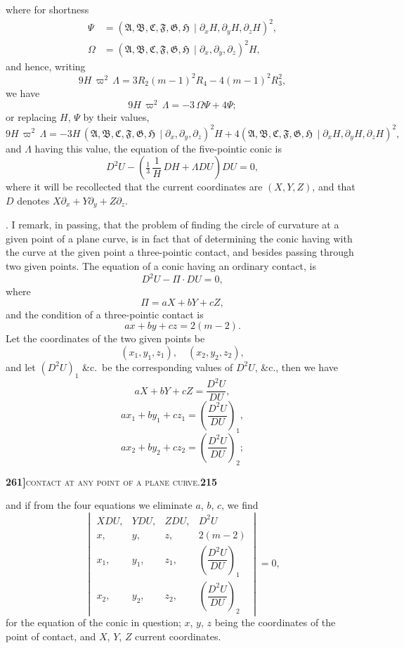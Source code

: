 \documentclass[11pt]{article}
\newcommand{\Cdel}{\mid}
\begin{document}
\noindent where for shortness
\[
\begin{aligned}
\Psi &= (\mathfrak{A}, \mathfrak{B}, \mathfrak{C}, \mathfrak{F}, \mathfrak{G}, \mathfrak{H}\,\Cdel\partial_x H, \partial_y H, \partial_z H)^2,\\
\Omega &= (\mathfrak{A}, \mathfrak{B}, \mathfrak{C}, \mathfrak{F}, \mathfrak{G}, \mathfrak{H}\,\Cdel\partial_x, \partial_y, \partial_z)^2 H,
\end{aligned}
\]
and hence, writing
\[
9H\,\varpi^2\,\Lambda = 3R_2(m-1)^2 R_4 - 4(m-1)^2 R_3^2,
\]
we have
\[
9H\,\varpi^2\,\Lambda = -3\,\Omega\Psi + 4\Psi;
\]
or replacing $H$, $\Psi$ by their values,
\[
9H\,\varpi^2\,\Lambda
   = -3H\,(\mathfrak{A}, \mathfrak{B}, \mathfrak{C}, \mathfrak{F}, \mathfrak{G}, \mathfrak{H}\,\Cdel\partial_x, \partial_y, \partial_z)^2 H
   + 4(\mathfrak{A}, \mathfrak{B}, \mathfrak{C}, \mathfrak{F}, \mathfrak{G}, \mathfrak{H}\,\Cdel\partial_x H, \partial_y H, \partial_z H)^2,
\]
and $\Lambda$ having this value, the equation of the five-pointic conic is
\[
D^2 U - \!\left(\tfrac{1}{3}\,\frac{1}{H}\,DH + \Lambda DU\right)\!DU = 0,
\]
where it will be recollected that the current coordinates are $(X, Y, Z)$, and that $D$ denotes $X\partial_x + Y\partial_y + Z\partial_z$.

\medskip

. I remark, in passing, that the problem of finding the circle of curvature at a given point of a plane curve, is in fact that of determining the conic having with the curve at the given point a three-pointic contact, and besides passing through two given points. The equation of a conic having an ordinary contact, is
\[
D^2 U - \Pi \cdot DU = 0,
\]
where
\[
\Pi = aX + bY + cZ,
\]
and the condition of a three-pointic contact is
\[
ax + by + cz = 2(m - 2).
\]
Let the coordinates of the two given points be
\[
(x_1, y_1, z_1),\quad (x_2, y_2, z_2),
\]
and let $(D^2U)_1$ \&c.\ be the corresponding values of $D^2U$, \&c., then we have
\[
aX + bY + cZ = \frac{D^2U}{DU},
\]
\[
ax_1 + by_1 + cz_1 = \!\left(\frac{D^2U}{DU}\right)_{\!1},
\]
\[
ax_2 + by_2 + cz_2 = \!\left(\frac{D^2U}{DU}\right)_{\!2};
\]

\newpage

\noindent\textbf{261]}\hfill\textsc{contact at any point of a plane curve.}\hfill\textbf{215}

\medskip

\noindent and if from the four equations we eliminate $a$, $b$, $c$, we find
\[
\begin{vmatrix}
XDU, & YDU, & ZDU, & D^2U\\
x, & y, & z, & 2(m-2)\\
x_1, & y_1, & z_1, & \left(\dfrac{D^2U}{DU}\right)_{\!1}\\[6pt]
x_2, & y_2, & z_2, & \left(\dfrac{D^2U}{DU}\right)_{\!2}
\end{vmatrix} = 0,
\]
for the equation of the conic in question; $x$, $y$, $z$ being the coordinates of the point of contact, and $X$, $Y$, $Z$ current coordinates.
\end{document}

